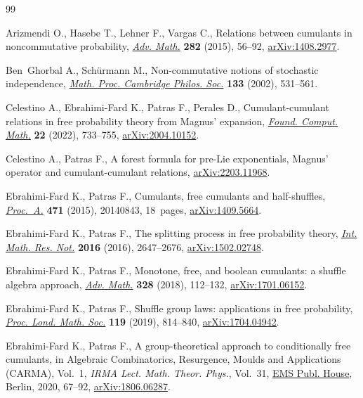 \documentclass[pdftex]{sigma}%
\numberwithin{equation}{section}
\begin{document}
\begin{thebibliography}{99}
\footnotesize\itemsep=0pt

Arizmendi O., Hasebe T., Lehner F., Vargas C., Relations between cumulants in
 noncommutative probability, \href{https://doi.org/10.1016/j.aim.2015.03.029}{\textit{Adv. Math.}} \textbf{282} (2015), 56--92,
 \href{https://arxiv.org/abs/1408.2977}{arXiv:1408.2977}.

Ben~Ghorbal A., Sch\"urmann M., Non-commutative notions of stochastic
 independence, \href{https://doi.org/10.1017/S0305004102006072}{\textit{Math. Proc. Cambridge Philos. Soc.}} \textbf{133}
 (2002), 531--561.

Celestino A., Ebrahimi-Fard K., Patras F., Perales D., Cumulant-cumulant
 relations in free probability theory from {M}agnus' expansion, \href{https://doi.org/10.1007/s10208-021-09512-0}{\textit{Found.
 Comput. Math.}} \textbf{22} (2022), 733--755, \href{https://arxiv.org/abs/2004.10152}{arXiv:2004.10152}.

Celestino A., Patras F., A forest formula for pre-{L}ie exponentials,
 {M}agnus' operator and cumulant-cumulant relations, \href{https://arxiv.org/abs/2203.11968}{arXiv:2203.11968}.

Ebrahimi-Fard K., Patras F., Cumulants, free cumulants and half-shuffles,
 \href{https://doi.org/10.1098/rspa.2014.0843}{\textit{Proc.~A.}} \textbf{471} (2015), 20140843, 18~pages,
 \href{https://arxiv.org/abs/1409.5664}{arXiv:1409.5664}.

Ebrahimi-Fard K., Patras F., The splitting process in free probability theory,
 \href{https://doi.org/10.1093/imrn/rnv209}{\textit{Int. Math. Res. Not.}} \textbf{2016} (2016), 2647--2676,
 \href{https://arxiv.org/abs/1502.02748}{arXiv:1502.02748}.

Ebrahimi-Fard K., Patras F., Monotone, free, and boolean cumulants: a shuffle
 algebra approach, \href{https://doi.org/10.1016/j.aim.2018.01.003}{\textit{Adv. Math.}} \textbf{328} (2018), 112--132,
 \href{https://arxiv.org/abs/1701.06152}{arXiv:1701.06152}.

Ebrahimi-Fard K., Patras F., Shuffle group laws: applications in free
 probability, \href{https://doi.org/10.1112/plms.12249}{\textit{Proc. Lond. Math. Soc.}} \textbf{119} (2019), 814--840,
 \href{https://arxiv.org/abs/1704.04942}{arXiv:1704.04942}.

Ebrahimi-Fard K., Patras F., A group-theoretical approach to conditionally free
 cumulants, in Algebraic Combinatorics, Resurgence, Moulds and Applications
 ({CARMA}), {V}ol.~1, \textit{IRMA Lect. Math. Theor. Phys.}, Vol.~31, \href{https://doi.org/10.4171/204-1/3}{EMS
 Publ. House}, Berlin, 2020, 67--92, \href{https://arxiv.org/abs/1806.06287}{arXiv:1806.06287}.


\end{thebibliography}
\end{document}
